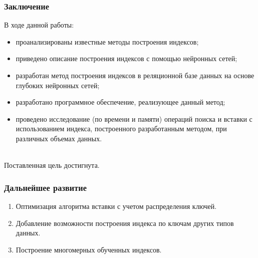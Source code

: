 \documentclass[8pt]{bmstu-pr}
\begin{document}
\begin{frame}
    \fontsize{22pt}{22pt}\selectfont
    \frametitle{Заключение}
    В ходе данной работы:
    \begin{itemize}
        \item проанализированы известные методы построения индексов;
        \item приведено описание построения индексов с помощью нейронных сетей;
        \item разработан метод построения индексов в реляционной базе
            данных на основе глубоких нейронных сетей;
        \item разработано программное обеспечение, реализующее данный метод;
        \item проведено исследование (по времени и памяти) операций поиска и
            вставки с использованием индекса, построенного разработанным
            методом, при различных объемах данных.
    \end{itemize}
    ~\\

    Поставленная цель достигнута.
\end{frame}

\begin{frame}
    \fontsize{22pt}{22pt}\selectfont
    \frametitle{Дальнейшее развитие}
    \begin{enumerate}
        \item Оптимизация алгоритма вставки с учетом распределения ключей.
        \item Добавление возможности построения индекса по ключам других типов
            данных.
        \item  Построение многомерных обученных индексов.
    \end{enumerate}
    ~\\
\end{frame}
\end{document}
